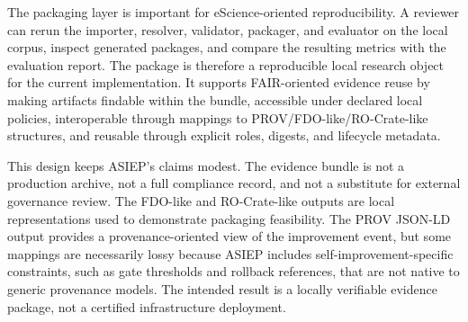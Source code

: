 The packaging layer is important for eScience-oriented reproducibility. A reviewer can rerun the importer, resolver, validator, packager, and evaluator on the local corpus, inspect generated packages, and compare the resulting metrics with the evaluation report. The package is therefore a reproducible local research object for the current implementation. It supports FAIR-oriented evidence reuse by making artifacts findable within the bundle, accessible under declared local policies, interoperable through mappings to PROV/FDO-like/RO-Crate-like structures, and reusable through explicit roles, digests, and lifecycle metadata.

This design keeps ASIEP's claims modest. The evidence bundle is not a production archive, not a full compliance record, and not a substitute for external governance review. The FDO-like and RO-Crate-like outputs are local representations used to demonstrate packaging feasibility. The PROV JSON-LD output provides a provenance-oriented view of the improvement event, but some mappings are necessarily lossy because ASIEP includes self-improvement-specific constraints, such as gate thresholds and rollback references, that are not native to generic provenance models. The intended result is a locally verifiable evidence package, not a certified infrastructure deployment.
